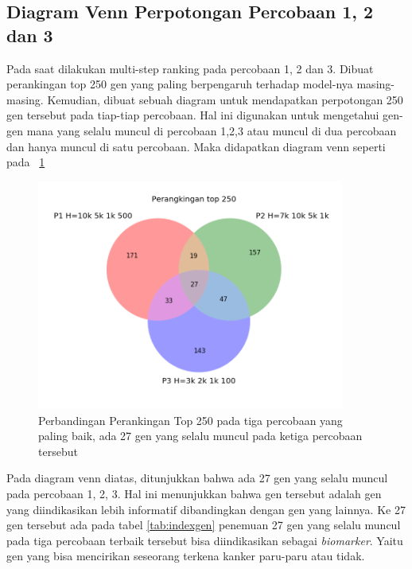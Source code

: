 \subsection{Diagram Venn Perpotongan Percobaan 1, 2 dan 3}

Pada saat dilakukan multi-step ranking pada percobaan 1, 2 dan 3. Dibuat perankingan top 250 gen yang paling berpengaruh terhadap model-nya masing-masing. Kemudian, dibuat sebuah diagram untuk mendapatkan perpotongan 250 gen tersebut pada tiap-tiap percobaan. Hal ini digunakan untuk mengetahui gen-gen mana yang selalu muncul di percobaan 1,2,3 atau muncul di dua percobaan dan hanya muncul di satu percobaan. Maka didapatkan diagram venn seperti pada \pic~\ref{fig:venn1}

\begin{figure}
	\centering
	\includegraphics[width=0.9\textwidth]
		{pics/venn1.png}
	\caption{Perbandingan Perankingan Top 250 pada tiga percobaan yang paling baik, ada 27 gen yang selalu muncul pada ketiga percobaan tersebut}
	\label{fig:venn1}
\end{figure}
Pada diagram venn diatas, ditunjukkan bahwa ada 27 gen yang selalu muncul pada percobaan 1, 2, 3. Hal ini menunjukkan bahwa gen tersebut adalah gen yang diindikasikan lebih informatif dibandingkan dengan gen yang lainnya. Ke 27 gen tersebut ada pada tabel \ref{tab:indexgen} penemuan 27 gen yang selalu muncul pada tiga percobaan terbaik tersebut bisa diindikasikan sebagai \textit{biomarker}. Yaitu gen yang bisa mencirikan seseorang terkena kanker paru-paru atau tidak.\\


